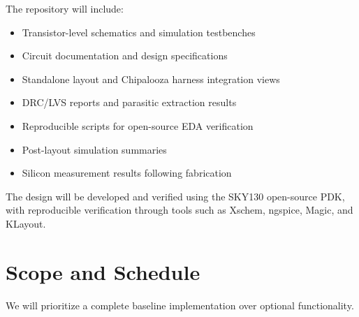 \documentclass[11pt,letterpaper]{article}
\begin{document}
The repository will include:

\begin{itemize}
    \item Transistor-level schematics and simulation testbenches

    \item Circuit documentation and design specifications

    \item Standalone layout and Chipalooza harness integration views

    \item DRC/LVS reports and parasitic extraction results

    \item Reproducible scripts for open-source EDA verification

    \item Post-layout simulation summaries

    \item Silicon measurement results following fabrication
\end{itemize}

The design will be developed and verified using the SKY130 open-source PDK, with reproducible verification through tools such as Xschem, ngspice, Magic, and KLayout.


\section{Scope and Schedule}

We will prioritize a complete baseline implementation over optional functionality.
\end{document}
